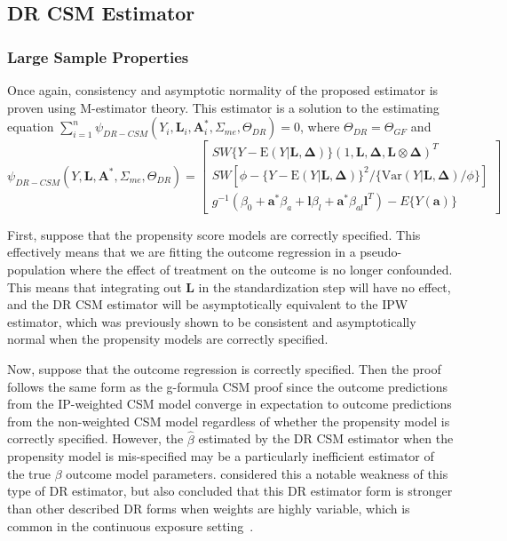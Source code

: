 \documentclass[12pt]{article}
\begin{document}
\subsection{DR CSM Estimator}

\subsubsection{Large Sample Properties}

Once again, consistency and asymptotic normality of the proposed estimator is proven using M-estimator theory. This estimator is a solution to the estimating equation \newline $\sum_{i=1}^{n} \psi_{DR-CSM}(Y_{i}, \bm{L}_{i}, \bm{A}_{i}^{*}, \Sigma_{me}, \Theta_{DR}) = 0$, where $\Theta_{DR} = \Theta_{GF}$ and
\begin{equation*}
    \psi_{DR-CSM}(Y, \bm{L}, \bm{A}^{*}, \Sigma_{me}, \Theta_{DR}) =
    \begin{bmatrix}
       SW\{ Y - \text{E}(Y | \bm{L}, \bm{\Delta}) \} (1, \bm{L}, \bm{\Delta}, \bm{L} \otimes \bm{\Delta})^{T} \\
        SW[\phi - \{ Y - \text{E}(Y | \bm{L}, \bm{\Delta}) \}^{2} / \{ \text{Var}(Y | \bm{L}, \bm{\Delta}) / \phi \}] \\
        g^{-1}(\beta_{0} + \bm{a}^{*}\beta_{a} + \bm{l}\beta_{l} +
        \bm{a}^{*}\beta_{al}\bm{l}^{T}) - E \{ Y(\bm{a}) \}
    \end{bmatrix}
\end{equation*}

First, suppose that the propensity score models are correctly specified. This effectively means that we are fitting the outcome regression in a pseudo-population where the effect of treatment on the outcome is no longer confounded. This means that integrating out $\bm{L}$ in the standardization step will have no effect, and the DR CSM estimator will be asymptotically equivalent to the IPW estimator, which was previously shown to be consistent and asymptotically normal when the propensity models are correctly specified.

Now, suppose that the outcome regression is correctly specified. Then the proof follows the same form as the g-formula CSM proof since the outcome predictions from the IP-weighted CSM model converge in expectation to outcome predictions from the non-weighted CSM model regardless of whether the propensity model is correctly specified. However, the $\hat{\beta}$ estimated by the DR CSM estimator when the propensity model is mis-specified may be a particularly inefficient estimator of the true $\beta$ outcome model parameters. \citet{robins2007} considered this a notable weakness of this type of DR estimator, but also concluded that this DR estimator form is stronger than other described DR forms when weights are highly variable, which is common in the continuous exposure setting~\citep{naimi2014}.
\end{document}
